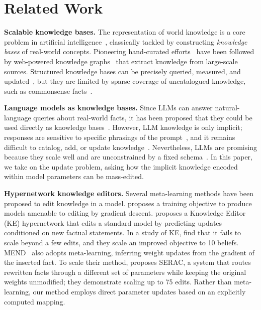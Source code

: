 \documentclass{article} %
\newcommand{\iclrnew}[1]{#1}
\begin{document}


\section{Related Work}

\textbf{Scalable knowledge bases.}
The representation of world knowledge is a core problem in artificial intelligence~\citep{richens1956preprogramming,minsky1974framework}, classically tackled by constructing \emph{knowledge bases} of real-world concepts.  Pioneering hand-curated efforts~\citep{lenat1995cyc,miller1995wordnet} have been followed by web-powered knowledge graphs~\citep{auer2007dbpedia,bollacker2007freebase,suchanek2007yago,havasi2007conceptnet,carlson2010toward,dong2014knowledge,vrandevcic2014wikidata,bosselut2019comet} that extract knowledge from large-scale sources. Structured knowledge bases can be precisely queried, measured, and updated~\citep{davis1993knowledge}, but they are limited by sparse coverage of uncatalogued knowledge, such as commonsense facts~\citep{weikum2021knowledge}.


\textbf{Language models as knowledge bases.}
Since LLMs can answer natural-language queries about real-world facts, it has been proposed that they could be used directly as knowledge bases~\citep{petroni2019language,roberts2020much,jiang2020can,shin2020autoprompt}.  However, LLM knowledge is only implicit; responses are sensitive to specific phrasings of the prompt~\citep{elazar2021measuring,petroni2020context}, and it remains difficult to catalog, add, or update knowledge~\citep{alkhamissi2022review}.  Nevertheless, LLMs are promising because they scale well and are unconstrained by a fixed schema~\citep{safavi2021relational}. In this paper, we take on the update problem, asking how the implicit knowledge encoded within model parameters can be mass-edited.



\textbf{Hypernetwork knowledge editors.} Several meta-learning methods have been proposed to edit knowledge in a model.
\iclrnew{%
\citet{sinitsin2019editable} proposes a training objective to produce models amenable to editing by gradient descent.}
\citet{decao-ke} proposes a Knowledge Editor (KE) hypernetwork that edits a standard model by predicting updates conditioned on new factual statements. In a study of KE, \citet{hase2021language} find that it fails to scale beyond a few edits, and they scale an improved objective to 10 beliefs. MEND~\citep{mend} also adopts meta-learning, inferring weight updates from the gradient of the inserted fact. To scale their method, \citet{serac} proposes SERAC, a system that routes rewritten facts through a different set of parameters while keeping the original weights unmodified; they demonstrate scaling up to 75 edits. Rather than meta-learning, our method employs direct parameter updates based on an explicitly computed mapping.
\end{document}
